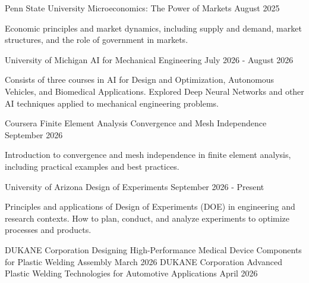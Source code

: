 \documentclass[11pt, a4paper]{awesome-cv}
\begin{document}
\begin{cventries}
  \cventry
    {Penn State University}
    {Microeconomics: The Power of Markets}
    {}
    {August 2025}
    {\begin{cvitems}
      \item {Economic principles and market dynamics, including supply and demand, market structures, and the role of government in markets.}
    \end{cvitems}}
    {}
  \cventry
    {University of Michigan}
    {AI for Mechanical Engineering}
    {}
    {July 2026 - August 2026}
    {\begin{cvitems}
      \item {Consists of three courses in AI for Design and Optimization, Autonomous Vehicles, and Biomedical Applications. Explored Deep Neural Networks and other AI techniques applied to mechanical engineering problems.}
    \end{cvitems}}
  \cventry
    {Coursera}
    {Finite Element Analysis Convergence and Mesh Independence}
    {}
    {September 2026}
    {\begin{cvitems}
      \item {Introduction to convergence and mesh independence in finite element analysis, including practical examples and best practices.}
    \end{cvitems}}
    {}
  \cventry
    {University of Arizona}
    {Design of Experiments}
    {}
    {September 2026 - Present}
    {\begin{cvitems}
      \item {Principles and applications of Design of Experiments (DOE) in engineering and research contexts. How to plan, conduct, and analyze experiments to optimize processes and products.}
    \end{cvitems}}
    {}
\end{cventries}

\begin{cventries}
  \cventry
    {DUKANE Corporation}
    {Designing High-Performance Medical Device Components for Plastic Welding Assembly}
    {}
    {March 2026}
    {}
  \cventry
    {DUKANE Corporation}
    {Advanced Plastic Welding Technologies for Automotive Applications}
    {}
    {April 2026}
    {}
\end{cventries}


\end{document}
